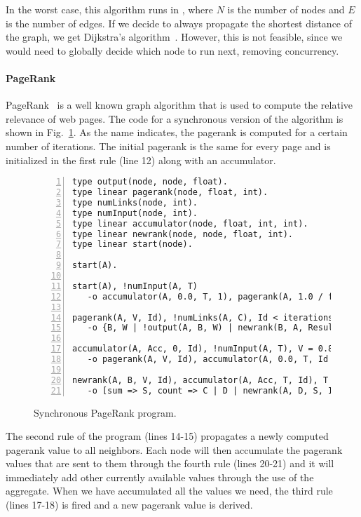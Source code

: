 In the worst case, this algorithm runs in , where $N$ is the number of nodes and $E$ is the
number of edges. If we decide to always propagate the shortest distance of the graph, we get Dijkstra's algorithm~\cite{Dijkstra}. However, this is
not feasible, since we would need to globally decide which node to run next, removing concurrency.

\paragraph{PageRank}

PageRank~\cite{Page:2001:MNR} is a well known graph algorithm that is used to compute the relative relevance of web pages.
The code for a synchronous version of the algorithm is shown in Fig.~\ref{code:pagerank}.
As the name indicates, the pagerank is computed for a certain number of iterations. The initial pagerank is the same for every page and is
initialized in the first rule (line 12) along with an accumulator.


\begin{figure}[h]
   \scriptsize\begin{Verbatim}[numbers=left]
type output(node, node, float).
type linear pagerank(node, float, int).
type numLinks(node, int).
type numInput(node, int).
type linear accumulator(node, float, int, int).
type linear newrank(node, node, float, int).
type linear start(node).

start(A).

start(A), !numInput(A, T)
   -o accumulator(A, 0.0, T, 1), pagerank(A, 1.0 / float(@world), 0).

pagerank(A, V, Id), !numLinks(A, C), Id < iterations, Result = V / float(C)
   -o {B, W | !output(A, B, W) | newrank(B, A, Result, Id + 1)}. // propagate new pagerank value

accumulator(A, Acc, 0, Id), !numInput(A, T), V = 0.85 + 0.15 * Acc, Id <= iterations
   -o pagerank(A, V, Id), accumulator(A, 0.0, T, Id + 1). // new pagerank value
	
newrank(A, B, V, Id), accumulator(A, Acc, T, Id), T > 0
   -o [sum => S, count => C | D | newrank(A, D, S, Id) | 1 | accumulator(A, Acc + V + S, T - 1 - C, Id)].
\end{Verbatim}
\caption{Synchronous PageRank program.}
\label{code:pagerank}
\normalsize
\end{figure}

The second rule of the program (lines 14-15) propagates a newly computed pagerank value to all neighbors. Each node will then accumulate
the pagerank values that are sent to them through the fourth rule (lines 20-21) and it will immediately add other currently available values
through the use of the aggregate. When we have accumulated all the values we need, the third rule (lines 17-18) is fired and a new pagerank value is derived.

